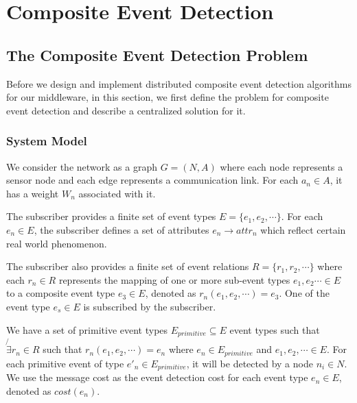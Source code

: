 \chapter{Composite Event Detection}
\label{chapter:ted}
\section{The Composite Event Detection Problem}
\label{sec:system_model}
Before we design and implement distributed composite event detection algorithms for our middleware, in this section, we first define the problem for composite event detection and describe a centralized solution for it.

\subsection{System Model}
We consider the network as a graph \(G=(N, A)\) where each node represents a sensor node and each edge represents a communication link. For each \(a_n\in A\), it has a weight \(W_n\) associated with it.

The subscriber provides a finite set of event types \(E=\{e_1,e_2,\cdots\}\). For each \(e_n\in E\), the subscriber defines a set of attributes \(e_n\rightarrow attr_n\) which reflect certain real world phenomenon. 

The subscriber also provides a finite set of event relations \(R=\{r_1,r_2, \cdots\}\) where each \(r_n\in R\) represents the mapping of one or more sub-event types \(e_1, e_2\cdots \in E\) to a composite event type \(e_3\in E\), denoted as \(r_n(e_1, e_2, \cdots)=e_3\). One of the event type \(e_s\in E\) is subscribed by the subscriber. %

\begin{comment}
\begin{figure}
\centering
\figurecurrentwidth{eventdag}
\caption{Event DAG}
\label{fig:eventdag}
\end{figure}
\end{comment}

We have a set of primitive event types \(E_{primitive}\subseteq E\) event types such that \(\not{\exists} r_n\in R\) such that \(r_n(e_1, e_2, \cdots)=e_n\) where \(e_n\in E_{primitive}\) and \(e_1, e_2, \cdots \in E\). For each primitive event of type \(e'_n\in E_{primitive}\), it will be detected by a node \(n_i\in N\). We use the message cost as the event detection cost for each event type \(e_n\in E\), denoted as \(cost(e_n)\).

